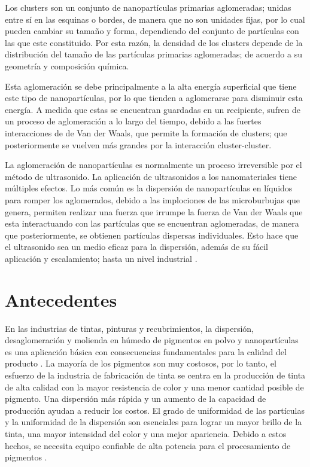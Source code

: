 \documentclass[12pt, letterpaper] {article}
\begin{document}
Los clusters son un conjunto de nanopartículas primarias aglomeradas; unidas entre sí en las esquinas o bordes, de manera que no son unidades fijas, por lo cual pueden cambiar su tamaño y forma, dependiendo del conjunto de partículas con las que este constituido. Por esta razón, la densidad de los clusters depende de la distribución del tamaño de las partículas primarias aglomeradas; de acuerdo a su geometría y composición química. 

Esta aglomeración se debe principalmente a la alta energía superficial que tiene este tipo de nanopartículas, por lo que tienden a aglomerarse para disminuir esta energía. A medida que estas se encuentran guardadas en un recipiente, sufren de un proceso de aglomeración a lo largo del tiempo, debido a las fuertes interacciones de de Van der Waals, que permite la formación de clusters; que posteriormente se vuelven más grandes por la interacción cluster-cluster. 

La aglomeración de nanopartículas es normalmente un proceso irreversible por el método de ultrasonido. La aplicación de ultrasonidos a los nanomateriales tiene múltiples efectos. Lo más común es la dispersión de nanopartículas en líquidos para romper los aglomerados, debido a las implociones de las microburbujas que genera, permiten realizar una fuerza que irrumpe la fuerza de Van der Waals que esta interactuando con las partículas que se encuentran aglomeradas, de manera que posteriormente, se obtienen partículas dispersas individuales. Esto hace que el ultrasonido sea un medio eficaz para la dispersión, además de su fácil aplicación y escalamiento; hasta un nivel industrial \cite{UDD}.

\section{Antecedentes}

En las industrias de tintas, pinturas y recubrimientos, la dispersión, desaglomeración y molienda en húmedo de pigmentos en polvo y nanopartículas es una aplicación básica con consecuencias fundamentales para la calidad del producto \cite{WUD}. 
La mayoría de los pigmentos son muy costosos, por lo tanto, el esfuerzo de la industria de fabricación de tinta se centra en la producción de tinta de alta calidad con la mayor resistencia de color y una menor cantidad posible de pigmento. Una dispersión más rápida y un aumento de la capacidad de producción ayudan a reducir los costos. El grado de uniformidad de las partículas y la uniformidad de la dispersión son esenciales para lograr un mayor brillo de la tinta, una mayor intensidad del color y una mejor apariencia. Debido a estos hechos, se necesita equipo confiable de alta potencia para el procesamiento de pigmentos \cite{UDNPS}. 
\end{document}
